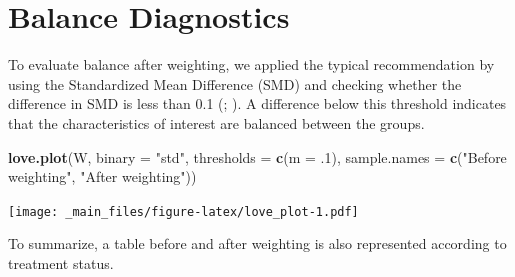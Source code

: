 \documentclass[
]{book}
\newenvironment{Shaded}{\begin{snugshade}}{\end{snugshade}}
\newcommand{\AttributeTok}[1]{\textcolor[rgb]{0.13,0.29,0.53}{#1}}
\newcommand{\DecValTok}[1]{\textcolor[rgb]{0.00,0.00,0.81}{#1}}
\newcommand{\FunctionTok}[1]{\textcolor[rgb]{0.13,0.29,0.53}{\textbf{#1}}}
\newcommand{\NormalTok}[1]{#1}
\newcommand{\StringTok}[1]{\textcolor[rgb]{0.31,0.60,0.02}{#1}}
\begin{document}
\section{Balance Diagnostics}\label{balance-diagnostics}

To evaluate balance after weighting, we applied the typical
recommendation by using the Standardized Mean Difference (SMD) and
checking whether the difference in SMD is less than 0.1
(;
). A
difference below this threshold indicates that the characteristics of
interest are balanced between the groups.

\begin{Shaded}
\begin{Highlighting}[]
\FunctionTok{love.plot}\NormalTok{(W, }
          \AttributeTok{binary =} \StringTok{"std"}\NormalTok{, }
          \AttributeTok{thresholds =} \FunctionTok{c}\NormalTok{(}\AttributeTok{m =}\NormalTok{ .}\DecValTok{1}\NormalTok{),}
          \AttributeTok{sample.names =} \FunctionTok{c}\NormalTok{(}\StringTok{"Before weighting"}\NormalTok{, }\StringTok{"After weighting"}\NormalTok{))}
\end{Highlighting}
\end{Shaded}

\texttt{[image: \_main\_files/figure-latex/love\_plot-1.pdf]}

To summarize, a table before and after weighting is also represented
according to treatment status.
\end{document}
